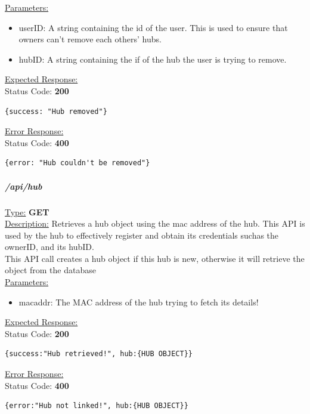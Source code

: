 \documentclass[preprint,12pt,3p]{elsarticle}
\newcommand{\forceindent}{\leavevmode{\parindent=1em\indent}}
\begin{document}
\underline{Parameters:}
\begin{itemize}
\item userID: A string containing the id of the user. This is used to ensure that owners can't remove each others' hubs.

\item hubID: A string containing the if of the hub the user is trying to remove.
\end{itemize}

\underline{Expected Response:}\\[5pt]
\forceindent Status Code: \textbf{200} \\
\begin{verbatim}
{success: "Hub removed"}
\end{verbatim}

\underline{Error Response:}\\[5pt]
\forceindent Status Code: \textbf{400} \\
\begin{verbatim}
{error: "Hub couldn't be removed"}
\end{verbatim}


\subparagraph*{/api/hub}
\underline{Type:} \textbf{GET}\\

\underline{Description:} Retrieves a hub object using the mac address of the hub. This API is used by the hub to effectively register and obtain its credentials suchas the ownerID, and its hubID.\\
This API call creates a hub object if this hub is new, otherwise it will retrieve the object from the database\\

\underline{Parameters:}
\begin{itemize}
\item macaddr: The MAC address of the hub trying to fetch its details!
\end{itemize}
\underline{Expected Response:}\\[5pt]
\forceindent Status Code: \textbf{200} \\
\begin{verbatim}
{success:"Hub retrieved!", hub:{HUB OBJECT}}
\end{verbatim}

\underline{Error Response:}\\[5pt]
\forceindent Status Code: \textbf{400} \\
\begin{verbatim}
{error:"Hub not linked!", hub:{HUB OBJECT}}
\end{verbatim}
\end{document}
